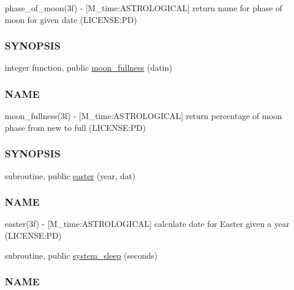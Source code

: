 \begin{DoxyCompactItemize}
\begin{DoxyCompactList}
phase\+\_\+of\+\_\+moon(3f) -\/ \mbox{[}M\+\_\+time\+:A\+S\+T\+R\+O\+L\+O\+G\+I\+C\+AL\mbox{]} return name for phase of moon for given date (L\+I\+C\+E\+N\+SE\+:PD) \subsubsection*{S\+Y\+N\+O\+P\+S\+IS}\end{DoxyCompactList}\item 
integer function, public \mbox{\hyperlink{namespacem__time_a702b39998a769b8f60070c0bec975ee2}{moon\+\_\+fullness}} (datin)
\begin{DoxyCompactList}\small\item\em \subsubsection*{N\+A\+ME}

moon\+\_\+fullness(3f) -\/ \mbox{[}M\+\_\+time\+:A\+S\+T\+R\+O\+L\+O\+G\+I\+C\+AL\mbox{]} return percentage of moon phase from new to full (L\+I\+C\+E\+N\+SE\+:PD) \subsubsection*{S\+Y\+N\+O\+P\+S\+IS}\end{DoxyCompactList}\item 
subroutine, public \mbox{\hyperlink{namespacem__time_a5ccb70e20160fcf26bb403dbff1f138a}{easter}} (year, dat)
\begin{DoxyCompactList}\small\item\em \subsubsection*{N\+A\+ME}

easter(3f) -\/ \mbox{[}M\+\_\+time\+:A\+S\+T\+R\+O\+L\+O\+G\+I\+C\+AL\mbox{]} calculate date for Easter given a year (L\+I\+C\+E\+N\+SE\+:PD) \end{DoxyCompactList}\item 
subroutine, public \mbox{\hyperlink{namespacem__time_a7c5d028ae1e1e01162ffc7bb55dcbbb1}{system\+\_\+sleep}} (seconds)
\begin{DoxyCompactList}\small\item\em \subsubsection*{N\+A\+ME}


\end{DoxyCompactList}
\end{DoxyCompactItemize}
